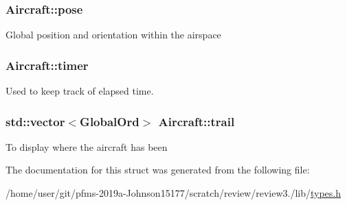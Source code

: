\subsubsection[{\texorpdfstring{pose}{pose}}]{ Aircraft\+::pose}\hypertarget{structAircraft_ae974de419f4b2570b0d4416e5e5aeac3}{}\label{structAircraft_ae974de419f4b2570b0d4416e5e5aeac3}
Global position and orientation within the airspace 
\subsubsection[{\texorpdfstring{timer}{timer}}]{ Aircraft\+::timer}\hypertarget{structAircraft_a256a704e2dbf859d95d4eb28b0e02aa3}{}\label{structAircraft_a256a704e2dbf859d95d4eb28b0e02aa3}
Used to keep track of elapsed time. 
\subsubsection[{\texorpdfstring{trail}{trail}}]{\setlength{\rightskip}{0pt plus 5cm}std\+::vector$<${\bf Global\+Ord}$>$ Aircraft\+::trail}\hypertarget{structAircraft_a11f949f7f9f22bae298b9c821fccf928}{}\label{structAircraft_a11f949f7f9f22bae298b9c821fccf928}
To display where the aircraft has been 

The documentation for this struct was generated from the following file\+:\begin{DoxyCompactItemize}
\item 
/home/user/git/pfms-\/2019a-\/\+Johnson15177/scratch/review/review3./lib/\hyperlink{types_8h}{types.\+h}\end{DoxyCompactItemize}
